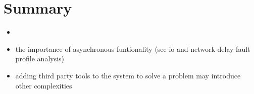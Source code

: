 \chapter{Summary}

\begin{itemize}
	\item
	\item the importance of asynchronous funtionality (see io and network-delay fault profile analysis)
	\item adding third party tools to the system to solve a problem may introduce other complexities
\end{itemize}